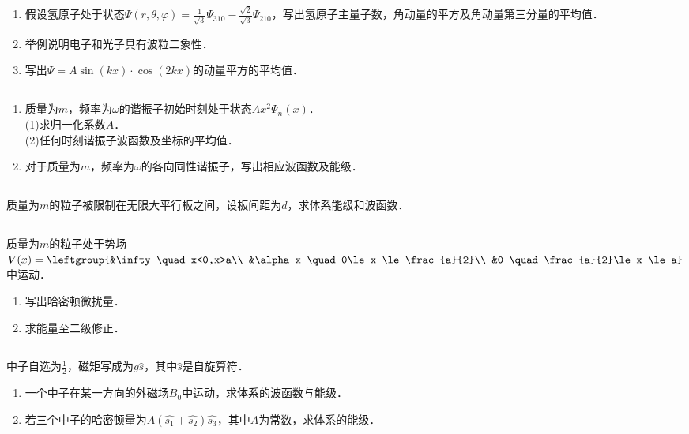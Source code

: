 
\subsection{ }
\begin{enumerate}
\item 假设氢原子处于状态$\Psi (r,\theta,\varphi)=\frac{1}{\sqrt{3}}\Psi_{310}-\frac{\sqrt{2}}{\sqrt{3}}\Psi_{210}$，写出氢原子主量子数，角动量的平方及角动量第三分量的平均值．
\item 举例说明电子和光子具有波粒二象性．
\item 写出$\Psi = A \sin(kx)\cdot\cos(2kx)$的动量平方的平均值．
\end{enumerate}
\subsection{ }
\begin{enumerate}
\item 质量为$m$，频率为$\omega$的谐振子初始时刻处于状态$Ax^2\Psi_n(x)$．\\
(1)求归一化系数$A$．\\
(2)任何时刻谐振子波函数及坐标的平均值．
\item 对于质量为$m$，频率为$\omega$的各向同性谐振子，写出相应波函数及能级．
\end{enumerate}
\subsection{ }
质量为$m$的粒子被限制在无限大平行板之间，设板间距为$d$，求体系能级和波函数．
\subsection{ }
质量为$m$的粒子处于势场$V(x)=\leftgroup{&\infty \quad x<0,x>a\\ &\alpha x \quad 0\le x \le \frac{a}{2}\\ &0 \quad \frac{a}{2}\le x \le a} $中运动．
\begin{enumerate}
\item 写出哈密顿微扰量．
\item 求能量至二级修正．
\end{enumerate}
\subsection{ }
中子自选为$\frac{1}{2}$，磁矩写成为$g\hat{s}$，其中$\hat{s}$是自旋算符．
\begin{enumerate}
\item 一个中子在某一方向的外磁场$B_0$中运动，求体系的波函数与能级．
\item 若三个中子的哈密顿量为$A(\hat{s_1}+\hat{s_2})\hat{s_3} $，其中$A$为常数，求体系的能级．
\end{enumerate}